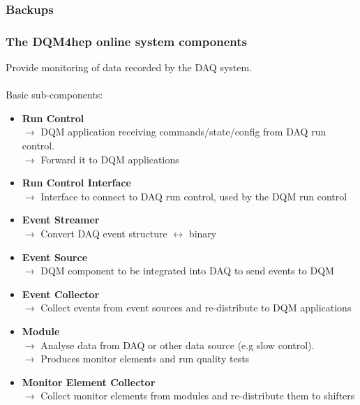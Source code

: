 \documentclass[presentation, 10pt]{beamer}
\begin{document}
\begin{frame}
  \frametitle{Backups}

\end{frame}


\begin{frame}
  \frametitle{The DQM4hep online system components}
  \footnotesize
  Provide monitoring of data recorded by the DAQ system. \\
  ~ \\
  Basic sub-components: \\
  \begin{itemize}
    \item \textbf{Run Control}\\
    $\rightarrow$ DQM application receiving commands/state/config from DAQ run control.\\
    $\rightarrow$ Forward it to DQM applications
    \item \textbf{Run Control Interface}\\
    $\rightarrow$ Interface to connect to DAQ run control, used by the DQM run control
    \item \textbf{Event Streamer}\\
    $\rightarrow$ Convert DAQ event structure $\leftrightarrow$ binary
    \item \textbf{Event Source}\\
    $\rightarrow$ DQM component to be integrated into DAQ to send events to DQM
    \item \textbf{Event Collector}\\
    $\rightarrow$ Collect events from event sources and re-distribute to DQM applications
    \item \textbf{Module}\\
    $\rightarrow$ Analyse data from DAQ or other data source (e.g slow control). \\
    $\rightarrow$ Produces monitor elements and run quality tests
    \item \textbf{Monitor Element Collector}\\
    $\rightarrow$ Collect monitor elements from modules and re-distribute them to shifters
  \end{itemize}

\end{frame}
\end{document}
